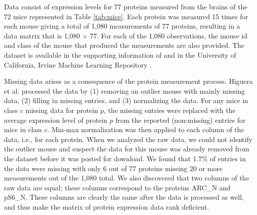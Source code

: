 \documentclass[12pt]{article}
\begin{document}
\begin{table}
    \centering
    \caption{Classes of 72 total mice.}
    \label{tab:mice}
\end{table}

Data consist of expression levels for 77 proteins measured from the brains of the 72 mice represented in Table \ref{tab:mice}.  Each protein was measured 15 times for each mouse giving a total of 1,080 measurements of 77 proteins, resulting in a data matrix that is 1,080 $\times$ 77. For each of the 1,080 observations, the mouse id and class of the mouse that produced the measurements are also provided.  The dataset is available in the supporting information of \cite{higuera_et_al_2015} and in the University of California, Irvine Machine Learning Repository \cite{data_pro_exp}.  

Missing data arises as a consequence of the protein measurement process. Higuera et al. processed the data by (1) removing an outlier mouse with mainly missing data, (2) filling in missing entries, and (3) normalizing the data.  For any mice in class $c$ missing data for protein $p$, the missing entries were replaced with the average expression level of protein $p$ from the reported (non-missing) entries for mice in class $c$.  Min-max normalization was then applied to each column of the data, i.e., for each protein.  When we analyzed the raw data, we could not identify the outlier mouse and suspect the data for this mouse was already removed from the dataset before it was posted for download. We found that 1.7\% of entries in the data were missing with only 6 out of 77 proteins missing 20 or more measurements out of the 1,080 total. We also discovered that two columns of the raw data are equal; these columns correspond to the proteins ARC\_N and pS6\_N.  These columns are clearly the same after the data is processed as well, and thus make the matrix of protein expression data rank deficient. 
\end{document}
